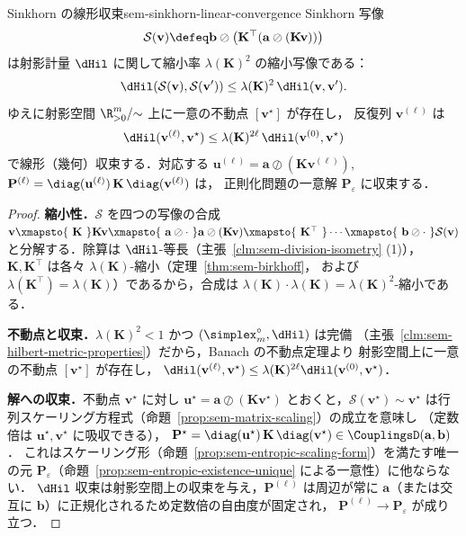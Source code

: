 \begin{theorem}{Sinkhorn の線形収束}{sem-sinkhorn-linear-convergence}
  Sinkhorn 写像
  \[
    \mathcal{S}(\mathbf{v}) \defeq
    \mathbf{b} \oslash \bigl(\mathbf{K}^\top(\mathbf{a}\oslash(\mathbf{K}\mathbf{v}))\bigr)
  \]
  は射影計量 $\dHil$ に関して縮小率 $\lambda(\mathbf{K})^2$ の縮小写像である：
  \[
    \dHil(\mathcal{S}(\mathbf{v}), \mathcal{S}(\mathbf{v}'))
    \leq \lambda(\mathbf{K})^2\, \dHil(\mathbf{v}, \mathbf{v}').
  \]
  ゆえに射影空間 $\R_{>0}^m/{\sim}$ 上に一意の不動点 $[\mathbf{v}^\star]$ が存在し，
  反復列 $\mathbf{v}^{(\ell)}$ は
  \[
    \dHil(\mathbf{v}^{(\ell)}, \mathbf{v}^\star)
    \leq \lambda(\mathbf{K})^{2\ell}\, \dHil(\mathbf{v}^{(0)}, \mathbf{v}^\star)
  \]
  で線形（幾何）収束する．対応する $\mathbf{u}^{(\ell)} = \mathbf{a}\oslash(\mathbf{K}\mathbf{v}^{(\ell)})$,
  $\mathbf{P}^{(\ell)} = \diag(\mathbf{u}^{(\ell)})\,\mathbf{K}\,\diag(\mathbf{v}^{(\ell)})$ は，
  正則化問題の一意解 $\mathbf{P}_\varepsilon$ に収束する．
\end{theorem}

\begin{proof}
  \textbf{縮小性．}$\mathcal{S}$ を四つの写像の合成
  $\mathbf{v} \xmapsto{\ \mathbf{K}\ } \mathbf{K}\mathbf{v}
  \xmapsto{\ \mathbf{a}\oslash\cdot\ } \mathbf{a}\oslash(\mathbf{K}\mathbf{v})
  \xmapsto{\ \mathbf{K}^\top\ } \cdots
  \xmapsto{\ \mathbf{b}\oslash\cdot\ } \mathcal{S}(\mathbf{v})$
  と分解する．除算は $\dHil$-等長（主張~\ref{clm:sem-division-isometry} (1)），
  $\mathbf{K}, \mathbf{K}^\top$ は各々 $\lambda(\mathbf{K})$-縮小（定理~\ref{thm:sem-birkhoff}，
  および $\lambda(\mathbf{K}^\top)=\lambda(\mathbf{K})$）であるから，合成は
  $\lambda(\mathbf{K})\cdot\lambda(\mathbf{K}) = \lambda(\mathbf{K})^2$-縮小である．

  \textbf{不動点と収束．}$\lambda(\mathbf{K})^2 < 1$ かつ $(\simplex_m^\circ, \dHil)$ は完備
  （主張~\ref{clm:sem-hilbert-metric-properties}）だから，Banach の不動点定理より
  射影空間上に一意の不動点 $[\mathbf{v}^\star]$ が存在し，
  $\dHil(\mathbf{v}^{(\ell)}, \mathbf{v}^\star) \leq \lambda(\mathbf{K})^{2\ell}\dHil(\mathbf{v}^{(0)}, \mathbf{v}^\star)$．

  \textbf{解への収束．}不動点 $\mathbf{v}^\star$ に対し
  $\mathbf{u}^\star = \mathbf{a}\oslash(\mathbf{K}\mathbf{v}^\star)$ とおくと，$\mathcal{S}(\mathbf{v}^\star) \sim \mathbf{v}^\star$
  は行列スケーリング方程式（命題~\ref{prop:sem-matrix-scaling}）の成立を意味し
  （定数倍は $\mathbf{u}^\star, \mathbf{v}^\star$ に吸収できる），
  $\mathbf{P}^\star = \diag(\mathbf{u}^\star)\,\mathbf{K}\,\diag(\mathbf{v}^\star) \in \CouplingsD(\mathbf{a}, \mathbf{b})$．
  これはスケーリング形（命題~\ref{prop:sem-entropic-scaling-form}）を満たす唯一の元
  $\mathbf{P}_\varepsilon$（命題~\ref{prop:sem-entropic-existence-unique} による一意性）に他ならない．
  $\dHil$ 収束は射影空間上の収束を与え，$\mathbf{P}^{(\ell)}$ は周辺が常に
  $\mathbf{a}$（または交互に $\mathbf{b}$）に正規化されるため定数倍の自由度が固定され，
  $\mathbf{P}^{(\ell)} \to \mathbf{P}_\varepsilon$ が成り立つ．
\end{proof}

